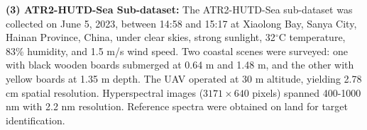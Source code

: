 \textbf{(3) ATR2-HUTD-Sea Sub-dataset:}  
The ATR2-HUTD-Sea sub-dataset was collected on June 5, 2023, between 14:58 and 15:17 at Xiaolong Bay, Sanya City, Hainan Province, China, under clear skies, strong sunlight, 32$^\circ$C temperature, 83\% humidity, and 1.5 m/s wind speed. Two coastal scenes were surveyed: one with black wooden boards submerged at 0.64 m and 1.48 m, and the other with yellow boards at 1.35 m depth. The UAV operated at 30 m altitude, yielding 2.78 cm spatial resolution. Hyperspectral images ($3171 \times 640$ pixels) spanned 400-1000 nm with 2.2 nm resolution. Reference spectra were obtained on land for target identification. 
\par
